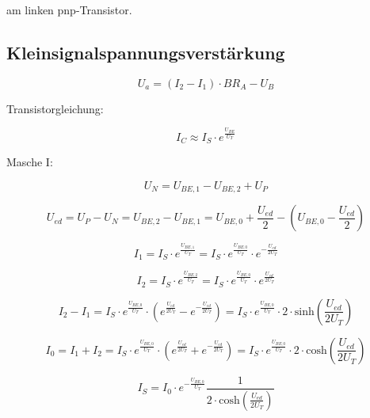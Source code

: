 am linken pnp-Transistor.



\subsection{Kleinsignalspannungsverstärkung}

\begin{equation}
    U_a = (I_2 - I_1) \cdot B R_A - U_B
\end{equation}

Transistorgleichung:

\begin{equation}
    I_C \approx I_S \cdot e^{\frac{U_{BE}}{U_T}}
\end{equation}

Masche I:

\begin{equation}
    U_N = U_{BE,1} - U_{BE,2} + U_P
\end{equation}

\begin{equation}
    U_{ed}  = U_P - U_N =  U_{BE,2} - U_{BE,1} = U_{BE,0} + \frac{U_{ed}}{2} - (U_{BE,0} - \frac{U_{ed}}{2})
\end{equation}

\begin{equation}
    I_1 = I_S \cdot e^{\frac{U_{BE,1}}{U_T}} = I_S \cdot e^{\frac{U_{BE,0}}{U_T}} \cdot e^{-\frac{U_{ed}}{2U_T}}
\end{equation}

\begin{equation}
    I_2 = I_S \cdot e^{\frac{U_{BE,2}}{U_T}} = I_S \cdot e^{\frac{U_{BE,0}}{U_T}} \cdot e^{\frac{U_{ed}}{2U_T}}
\end{equation}

\begin{equation}
    I_2 - I_1 = I_S \cdot e^{\frac{U_{BE,0}}{U_T}} \cdot ( e^{\frac{U_{ed}}{2U_T}} - e^{-\frac{U_{ed}}{2U_T}} ) = I_S \cdot e^{\frac{U_{BE,0}}{U_T}} \cdot 2 \cdot \text{sinh}\left( \frac{U_{ed}}{2U_T}  \right)
\end{equation}

\begin{equation}
    I_0 = I_1 + I_2 = I_S \cdot e^{\frac{U_{BE,0}}{U_T}} \cdot ( e^{\frac{U_{ed}}{2U_T}} + e^{-\frac{U_{ed}}{2U_T}} ) = I_S \cdot e^{\frac{U_{BE,0}}{U_T}} \cdot 2 \cdot \text{cosh}\left( \frac{U_{ed}}{2U_T}  \right)
\end{equation}

\begin{equation}
    I_S = I_0 \cdot e^{-\frac{U_{BE,0}}{U_T}} \frac{1}{2 \cdot \text{cosh}\left( \frac{U_{ed}}{2U_T}  \right)}
\end{equation}

